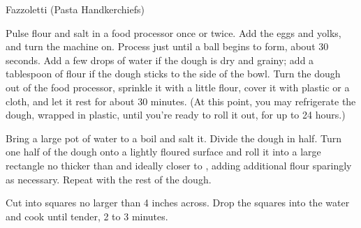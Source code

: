 \begin{recipe}{Fazzoletti (Pasta Handkerchiefs)}
    \label{fazzoletti}

    \begin{ingredients}
    \end{ingredients}

    \begin{instructions}
        Pulse flour and salt in a food processor once or twice.
        Add the eggs and yolks, and turn the machine on.
        Process just until a ball begins to form, about 30 seconds.
        Add a few drops of water if the dough is dry and grainy; add a tablespoon of flour if the dough sticks to the side of the bowl.
        Turn the dough out of the food processor, sprinkle it with a little flour, cover it with plastic or a cloth, and let it rest for about 30 minutes.
        (At this point, you may refrigerate the dough, wrapped in plastic, until you’re ready to roll it out, for up to 24 hours.)

        Bring a large pot of water to a boil and salt it.
        Divide the dough in half.
        Turn one half of the dough onto a lightly floured surface and roll it into a large rectangle no thicker than \quarter\inch and ideally closer to \eighth\inch, adding additional flour sparingly as necessary.
        Repeat with the rest of the dough.

        Cut into squares no larger than 4 inches across.
        Drop the squares into the water and cook until tender, 2 to 3 minutes.
    \end{instructions}
\end{recipe}
